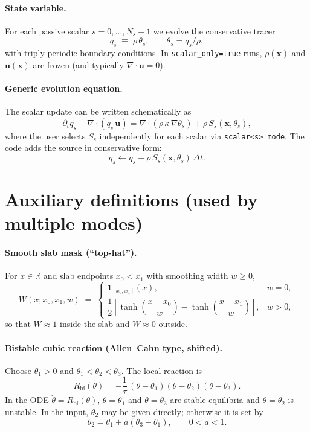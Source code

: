 
\paragraph{State variable.}
For each passive scalar $s=0,\dots,N_s-1$ we evolve the conservative tracer
\[
q_s \;\equiv\; \rho\,\theta_s,
\qquad \theta_s = q_s/\rho,
\]
with triply periodic boundary conditions. In \texttt{scalar\_only=true} runs, $\rho(\mathbf{x})$ and $\mathbf{u}(\mathbf{x})$ are frozen (and typically $\nabla\!\cdot\mathbf{u}=0$).

\paragraph{Generic evolution equation.}
The scalar update can be written schematically as
\begin{equation}
\partial_t q_s + \nabla\cdot(q_s\,\mathbf{u})
= \nabla\cdot(\rho\,\kappa\,\nabla \theta_s) + \rho\,S_s(\mathbf{x},\theta_s),
\label{eq:generic}
\end{equation}
where the user selects $S_s$ independently for each scalar via \texttt{scalar<s>\_mode}. The code adds the source in conservative form:
\[
q_s \leftarrow q_s + \rho\,S_s(\mathbf{x},\theta_s)\,\Delta t.
\]

\section*{Auxiliary definitions (used by multiple modes)}

\paragraph{Smooth slab mask (``top-hat'').}
For $x\in\mathbb{R}$ and slab endpoints $x_0<x_1$ with smoothing width $w\ge 0$,
\begin{equation}
W(x;x_0,x_1,w) \;=\;
\begin{cases}
\mathbf{1}_{[x_0,x_1]}(x), & w=0,\\[2mm]
\dfrac{1}{2}\left[\tanh\!\left(\dfrac{x-x_0}{w}\right) - \tanh\!\left(\dfrac{x-x_1}{w}\right)\right], & w>0,
\end{cases}
\label{eq:tophat}
\end{equation}
so that $W\approx 1$ inside the slab and $W\approx 0$ outside.

\paragraph{Bistable cubic reaction (Allen--Cahn type, shifted).}
Choose $\theta_1>0$ and $\theta_1<\theta_2<\theta_3$. The local reaction is
\begin{equation}
R_{\mathrm{bi}}(\theta)
= -\frac{1}{\tau}\,(\theta-\theta_1)(\theta-\theta_2)(\theta-\theta_3).
\label{eq:bistable}
\end{equation}
In the ODE $\dot\theta=R_{\mathrm{bi}}(\theta)$, $\theta=\theta_1$ and $\theta=\theta_3$ are stable equilibria and $\theta=\theta_2$ is unstable. In the input, $\theta_2$ may be given directly; otherwise it is set by
\[
\theta_2 = \theta_1 + a(\theta_3-\theta_1), \qquad 0<a<1.
\]

